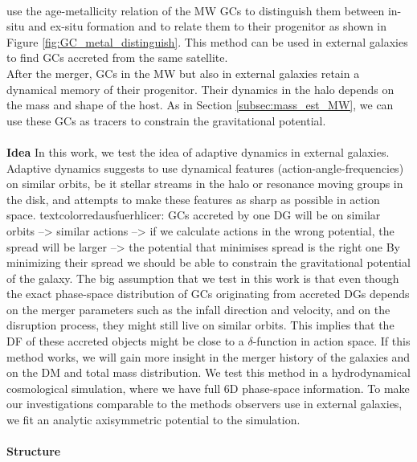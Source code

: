 \\\citet{Leaman...agemetall.MWGCs...2013} use the age-metallicity relation of the \ac{MW} \acp{GC} to distinguish them between in-situ and ex-situ formation and to relate them to their progenitor as shown in Figure \ref{fig:GC_metal_distinguish}. This method can be used in external galaxies to find \acp{GC} accreted from the same satellite.
\\
After the merger, \acp{GC} in the \ac{MW} but also in external galaxies retain a dynamical memory of their progenitor. Their dynamics in the halo depends on the mass and shape of the host. As in Section \ref{subsec:mass_est_MW}, we can use these \acp{GC} as tracers to constrain the gravitational potential.
\\\\
\textbf{Idea}
In this work, we test the idea of adaptive dynamics \citep{Binney...adaptivedynamics...2005} in external galaxies. Adaptive dynamics suggests to use dynamical features (action-angle-frequencies) on similar orbits, be it stellar streams in the halo or resonance moving groups in the disk, and attempts to make these features as sharp as possible in action space. textcolor{red}{ausfuerhlicer: GCs accreted by one DG will be on similar orbits --> similar actions --> if we calculate actions in the wrong potential, the spread will be larger --> the potential that minimises spread is the right one} By minimizing their spread we should be able to constrain the gravitational potential of the galaxy. The big assumption that we test in this work is that even though the exact phase-space distribution of \acp{GC} originating from accreted \acp{DG} depends on the merger parameters such as the infall direction and velocity, and on the disruption process, they might still live on similar orbits. This implies that the \ac{DF} of these accreted objects might be close to a $\delta$-function in action space. If this method works, we will gain more insight in the merger history of the galaxies and on the \ac{DM} and total mass distribution. We test this method in a hydrodynamical cosmological simulation, where we have full 6D phase-space information. To make our investigations comparable to the methods observers use in external galaxies, we fit an analytic axisymmetric potential to the simulation.
\\\\
\textbf{Structure}
